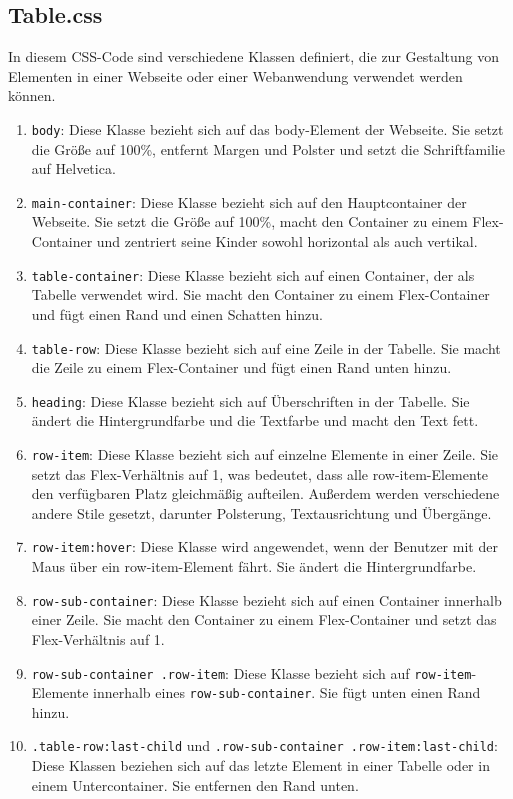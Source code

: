 \documentclass[./dokumentation.tex]{subfiles}
\begin{document}
\subsection{Table.css}
In diesem CSS-Code sind verschiedene Klassen definiert, die zur Gestaltung von Elementen in einer Webseite oder einer Webanwendung verwendet werden können.\\
\begin{enumerate}
    \item  \verb+body+: Diese Klasse bezieht sich auf das body-Element der Webseite. Sie setzt die Größe auf 100\%, entfernt Margen und Polster und setzt die Schriftfamilie auf Helvetica.\\
    \item \verb+main-container+: Diese Klasse bezieht sich auf den Hauptcontainer der Webseite. Sie setzt die Größe auf 100\%, macht den Container zu einem Flex-Container und zentriert seine Kinder sowohl horizontal als auch vertikal.\\
    \item \verb+table-container+: Diese Klasse bezieht sich auf einen Container, der als Tabelle verwendet wird. Sie macht den Container zu einem Flex-Container und fügt einen Rand und einen Schatten hinzu.\\
    \item  \verb+table-row+: Diese Klasse bezieht sich auf eine Zeile in der Tabelle. Sie macht die Zeile zu einem Flex-Container und fügt einen Rand unten hinzu.\\
    \item \verb+heading+: Diese Klasse bezieht sich auf Überschriften in der Tabelle. Sie ändert die Hintergrundfarbe und die Textfarbe und macht den Text fett.\\
    \item \verb+row-item+: Diese Klasse bezieht sich auf einzelne Elemente in einer Zeile. Sie setzt das Flex-Verhältnis auf 1, was bedeutet, dass alle row-item-Elemente den verfügbaren Platz gleichmäßig aufteilen. Außerdem werden verschiedene andere Stile gesetzt, darunter Polsterung, Textausrichtung und Übergänge.\\
    \item  \verb+row-item:hover+: Diese Klasse wird angewendet, wenn der Benutzer mit der Maus über ein row-item-Element fährt. Sie ändert die Hintergrundfarbe.\\
    \item \verb+row-sub-container+: Diese Klasse bezieht sich auf einen Container innerhalb einer Zeile. Sie macht den Container zu einem Flex-Container und setzt das Flex-Verhältnis auf 1.\\
    \item \verb+row-sub-container .row-item+: Diese Klasse bezieht sich auf \verb+row-item+-Elemente innerhalb eines \verb+row-sub-container+. Sie fügt unten einen Rand hinzu.\\
    \item \verb+.table-row:last-child+ und \verb+.row-sub-container .row-item:last-child+: Diese Klassen beziehen sich auf das letzte Element in einer Tabelle oder in einem Untercontainer. Sie entfernen den Rand unten.
\end{enumerate}
\end{document}
